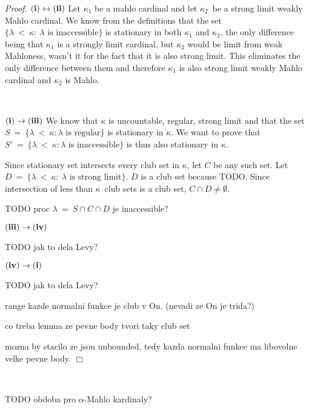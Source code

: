 \documentclass[12pt,a4paper]{article}
\newenvironment{proof}
{\noindent \textit{Proof.}}
{\hspace*{\fill} $\Box$}
\renewcommand{\iff}{\leftrightarrow}
\newcommand{\then}{\rightarrow}
\begin{document}
\begin{proof}
$\bold{(i) \iff (ii)}$
Let $\kappa_1$ be a mahlo cardinal and let $\kappa_2$ be a strong limit weakly Mahlo cardinal. We know from the definitions that the set $\{\lambda\ <\ \kappa:\ \lambda\mbox{ is inaccessible}\}$ is stationary in both $\kappa_1$ and $\kappa_2$, the only difference being that $\kappa_1$ is a strongly limit cardinal, but $\kappa_2$ would be limit from weak Mahloness, wasn't it for the fact that it is also strong limit. This eliminates the only difference between them and therefore $\kappa_1$ is also strong limit weakly Mahlo cardinal and $\kappa_2$ is Mahlo.

\

$\bold{(i) \then (iii)}$
We know that $\kappa$ is uncountable, regular, strong limit and that the set $S\ =\ \{\lambda\ <\ \kappa: \lambda\mbox{ is regular}\}$ is stationary in $\kappa$. 
We want to prove that $S'\ =\ \{\lambda\ <\ \kappa: \lambda\mbox{ is inaccessible}\}$ is thus also stationary in $\kappa$.

Since stationary set intersects every club set in $\kappa$, let $C$ be any such set. Let $D\ =\ \{ \lambda\ <\ \kappa:\ \lambda\mbox{ is strong limit}\}$. 
$D$ is a club set because TODO.
Since intersection of less than $\kappa$ club sets is a club set, $C \cap D \neq \emptyset$. 

TODO proc $\lambda\ =\ S \cap C \cap D$ je inaccessible?


$\bold{(iii) \then (iv)}$

TODO jak to dela Levy? 

$\bold{(iv) \then (i)}$

TODO jak to dela Levy? 

range kazde normalni funkce je club v On. (nevadi ze On je trida?)

co treba lemma ze pevne body tvori taky club set

mozna by stacilo ze jsou unbounded, tedy kazda normalni funkce ma libovolne velke pevne body.
\end{proof}

\

TODO obdoba pro $\alpha$-Mahlo kardinaly?
\end{document}
